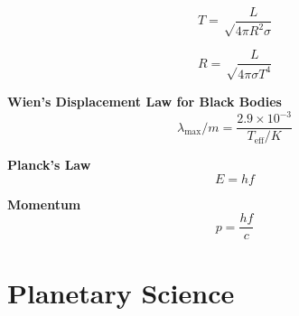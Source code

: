 \documentclass{article}
\begin{document}
\begin{equation}
T = \sqrt  \frac {L}{4 \pi R^2 \sigma}
\end{equation}

\begin{equation}
R = \sqrt \frac {L}{4 \pi \sigma T^4}
\end{equation}

\textbf {Wien's Displacement Law for Black Bodies}
\begin{equation}
\lambda_\mathrm{max}/m = \frac {2.9 \times 10^{-3}}{T_\mathrm{eff}/K}
\end{equation}

\textbf {Planck's Law}
\begin{equation}
E = hf
\end{equation}

\textbf {Momentum}
\begin{equation}
p = \frac {hf}{c}
\end{equation}

\newpage

\section {Planetary Science}
\end{document}

